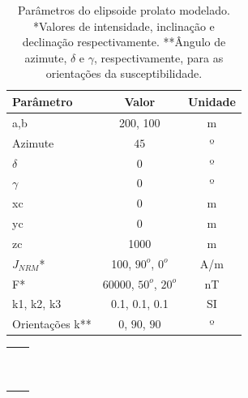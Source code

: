 \begin{table}[h!]
	\begin{center}
		\begin{tabular}{|l|c|c|}
			\hline
			\textbf{Parâmetro}  & \textbf{Valor}  & \textbf{Unidade} \\
			\hline 
			a,b   & 200, 100 & m\\
			\hline
			Azimute   & $45$ & º\\
			\hline
			$\delta$    & $0$ & º\\
			\hline
			$\gamma$   & $0$  & º\\
			\hline
			xc   & 0  & m\\
			\hline          
			yc   & 0  & m\\
			\hline                
			zc   & 1000  & m\\
			\hline
			$J_{NRM}$*  & 100, $90^o$, $0^o$ & A/m\\
			\hline
			F*    & 60000, $50^o$, $20^o$ & nT\\
			\hline
			k1, k2, k3   & 0.1, 0.1, 0.1  & SI\\
			\hline
			Orientações k**   & $0$, $90$, $90$  & º\\
			\hline
			
		\end{tabular}
		\caption{Parâmetros do elipsoide prolato modelado. *Valores de intensidade, inclinação e declinação respectivamente. **Ângulo de azimute, $\delta$ e $\gamma$, respectivamente, para as orientações da susceptibilidade.}
	\end{center}
	\label{tab:prolato}
\end{table}

\begin{table}[h!]
	\begin{center}
		\begin{tabular}{lc}
		
			 &  \\
			 & \\
			 & \\
			 & \\
			& \\
			& \\ 
			& \\
			& \\
			& \\ 
			& \\
\end{tabular}
\end{center}
\end{table}

